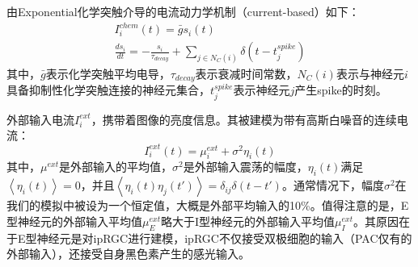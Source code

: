\documentclass[lang=cn,11pt,a4paper,cite=numbers]{elegantpaper}
\begin{document}
  由Exponential化学突触介导的电流动力学机制（current-based）如下：
\begin{gather}
    I_{i}^{chem}(t) = \bar{g}s_{i}(t) \\
    \frac{ds_{i}}{dt} = -\frac{s_{i}}{\tau_{decay}} + \sum_{j \in N_{C}(i)}\delta(t - t_{j}^{spike})
\end{gather}
其中，$\bar{g}$表示化学突触平均电导，$\tau_{decay}$表示衰减时间常数，$N_{C}(i)$表示与神经元$i$具备抑制性化学突触连接的神经元集合，$t_{j}^{spike}$表示神经元$j$产生spike的时刻。

  外部输入电流$I_{i}^{ext}$，携带着图像的亮度信息。其被建模为带有高斯白噪音的连续电流：
\begin{equation}
    I_{i}^{ext}(t) = \mu_{i}^{ext} + \sigma^{2}\eta_{i}(t)
\end{equation}
其中，$\mu^{ext}$是外部输入的平均值，$\sigma^{2}$是外部输入震荡的幅度，$\eta_{i}(t)$满足$\left\langle\eta_{i}(t)\right\rangle = 0$，并且$\left\langle\eta_{i}(t)\eta_{j}(t')\right\rangle = \delta_{ij}\delta(t - t')$。通常情况下，幅度$\sigma^{2}$在我们的模拟中被设为一个恒定值，大概是外部平均输入的10\%。值得注意的是，E型神经元的外部输入平均值$\mu_{E}^{ext}$略大于I型神经元的外部输入平均值$\mu_{I}^{ext}$。其原因在于E型神经元是对ipRGC进行建模，ipRGC不仅接受双极细胞的输入（PAC仅有的外部输入），还接受自身黑色素产生的感光输入。


\end{document}
